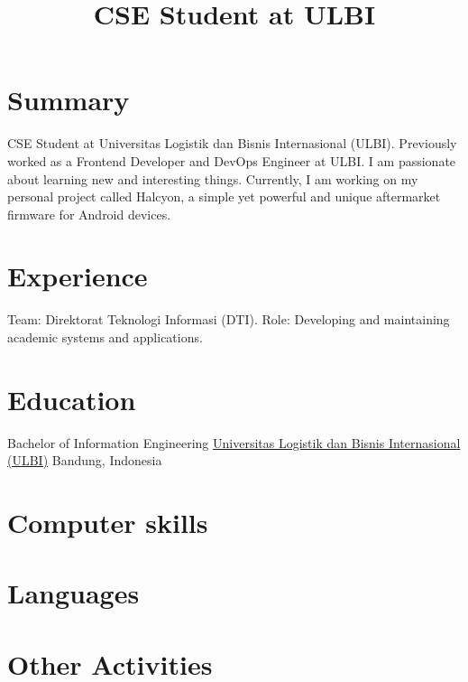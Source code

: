 \documentclass[11pt,letterpaper,sans]{moderncv}
\title{CSE Student at ULBI}
\begin{document}
\maketitle

\section{Summary}
CSE Student at Universitas Logistik dan Bisnis Internasional (ULBI). Previously worked as a Frontend Developer and DevOps Engineer at ULBI. I am passionate about learning new and interesting things. Currently, I am working on my personal project called Halcyon, a simple yet powerful and unique aftermarket firmware for Android devices.

\section{Experience}
  {Team: Direktorat Teknologi Informasi (DTI). \newline
   Role: Developing and maintaining academic systems and applications.}

\section{Education}
  {Bachelor of Information Engineering}
  {\href{http://ulbi.ac.id/}{\newline{}
   Universitas Logistik dan Bisnis Internasional (ULBI)} \newline}{Bandung, Indonesia}{}{}

\section{Computer skills}

\section{Languages}

\section{Other Activities}
\end{document}

